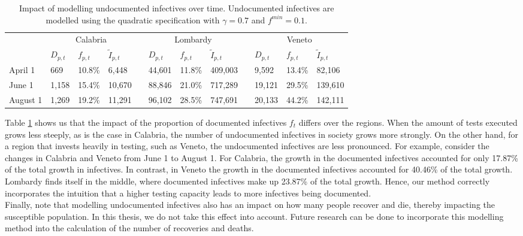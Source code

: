 \documentclass[12pt]{article}
\begin{document}
	\begin{table}[H]
		\centering
		\caption{Impact of modelling undocumented infectives over time. Undocumented infectives are modelled using the quadratic specification with $\gamma = 0.7$ and $f^{min}=0.1$.}
		\label{tab:f_t_over_time}
		\begin{tabular}{llllllllllll}
		    \toprule 
                     & \multicolumn{3}{c}{Calabria} && \multicolumn{3}{c}{Lombardy} && \multicolumn{3}{c}{Veneto} \\
                     \cmidrule{2-4}\cmidrule{6-8}\cmidrule{10-12}
                     & $D_{p,t}$  & $f_{p,t}$   & $\tilde{I}_{p,t}$   && $D_{p,t}$  & $f_{p,t}$   & $\tilde{I}_{p,t}$    && $D_{p,t}$  & $f_{p,t}$  & $\tilde{I}_{p,t}$   \\ \midrule
            April 1  & 669     & 10.8\%  & 6,448   && 44,601  & 11.8\%  & 409,003  && 9,592   & 13.4\% & 82,106  \\
            June 1   & 1,158   & 15.4\%  & 10,670  && 88,846  & 21.0\%  & 717,289  && 19,121  & 29.5\% & 139,610 \\
            August 1 & 1,269   & 19.2\%  & 11,291  && 96,102  & 28.5\%  & 747,691  && 20,133  & 44.2\% & 142,111 \\ \bottomrule
        \end{tabular}
	\end{table}
	
	\newpage
	Table \ref{tab:f_t_over_time} shows us that the impact of the proportion of documented infectives $f_t$ differs over the regions. When the amount of tests executed grows less steeply, as is the case in Calabria, the number of undocumented infectives in society grows more strongly. On the other hand, for a region that invests heavily in testing, such as Veneto, the undocumented infectives are less pronounced. For example, consider the changes in Calabria and Veneto from June 1 to August 1. For Calabria, the growth in the documented infectives accounted for only 17.87\% of the total growth in infectives. In contrast, in Veneto the growth in the documented infectives accounted for 40.46\% of the total growth. Lombardy finds itself in the middle, where documented infectives make up 23.87\% of the total growth. Hence, our method correctly incorporates the intuition that a higher testing capacity leads to more infectives being documented.
	\\
	
	Finally, note that modelling undocumented infectives also has an impact on how many people recover and die, thereby impacting the susceptible population. In this thesis, we do not take this effect into account. Future research can be done to incorporate this modelling method into the calculation of the number of recoveries and deaths.
	
\end{document}
